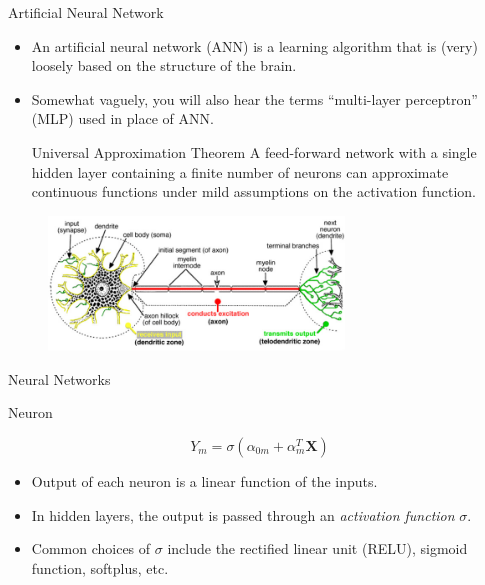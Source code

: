 \documentclass{beamer}
\let \vec \mathbf
\begin{document}
\begin{frame}{Artificial Neural Network}
\begin{itemize}
        \item An artificial neural network (ANN) is a learning algorithm that is (very) loosely based on the structure of the brain.
        \item Somewhat vaguely, you will also hear the terms ``multi-layer perceptron'' (MLP) used in place of ANN.
        \begin{block}{Universal Approximation Theorem\cite{csajiApproximationArtificialNeural}}
        A feed-forward network with a single hidden layer containing a finite number of neurons can approximate continuous functions under mild assumptions on the activation function. 
        \end{block}
\end{itemize}
\begin{figure}
        \centering
        \includegraphics[width=0.7\textwidth]{figures/neuron.jpg}
    \end{figure}
\end{frame}


\begin{frame}{Neural Networks}
    
\end{frame}


\begin{frame}{Neuron}
\begin{figure}
\end{figure}
\begin{equation*}
    Y_m = \sigma(\alpha_{0m} + \alpha_{m}^T \vec{X})
\end{equation*}
    \begin{itemize}
        \item Output of each neuron is a linear function of the inputs.
        \item In hidden layers, the output is passed through an \textit{activation function} $\sigma$.
        \item Common choices of $\sigma$ include the rectified linear unit (RELU), sigmoid function, softplus, etc.
    \end{itemize}
\end{frame}
\end{document}
